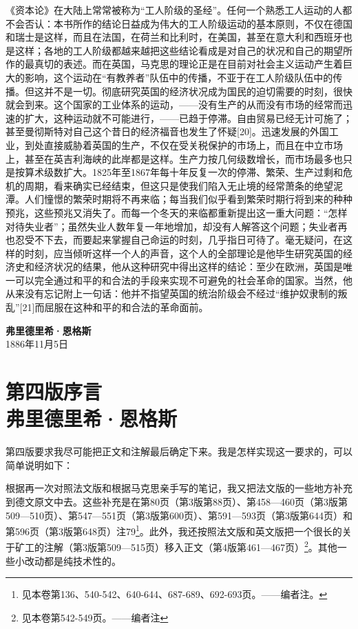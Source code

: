 \documentclass{ctexbook}
\begin{document}
《资本论》在大陆上常常被称为“工人阶级的圣经”。任何一个熟悉工人运动的人都不会否认：本书所作的结论日益成为伟大的工人阶级运动的基本原则，不仅在德国和瑞士是这样，而且在法国，在荷兰和比利时，在美国，甚至在意大利和西班牙也是这样；各地的工人阶级都越来越把这些结论看成是对自己的状况和自己的期望所作的最真切的表述。而在英国，马克思的理论正是在目前对社会主义运动产生着巨大的影响，这个运动在“有教养者”队伍中的传播，不亚于在工人阶级队伍中的传播。但这并不是一切。彻底研究英国的经济状况成为国民的迫切需要的时刻，很快就会到来。这个国家的工业体系的运动，——没有生产的从而没有市场的经常而迅速的扩大，这种运动就不可能进行，——已趋于停滞。自由贸易已经无计可施了；甚至曼彻斯特对自己这个昔日的经济福音也发生了怀疑[20]。迅速发展的外国工业，到处直接威胁着英国的生产，不仅在受关税保护的市场上，而且在中立市场上，甚至在英吉利海峡的此岸都是这样。生产力按几何级数增长，而市场最多也只是按算术级数扩大。1825年至1867年每十年反复一次的停滞、繁荣、生产过剩和危机的周期，看来确实已经结束，但这只是使我们陷入无止境的经常萧条的绝望泥潭。人们憧憬的繁荣时期将不再来临；每当我们似乎看到繁荣时期行将到来的种种预兆，这些预兆又消失了。而每一个冬天的来临都重新提出这一重大问题：“怎样对待失业者”；虽然失业人数年复一年地增加，却没有人解答这个问题；失业者再也忍受不下去，而要起来掌握自己命运的时刻，几乎指日可待了。毫无疑问，在这样的时刻，应当倾听这样一个人的声音，这个人的全部理论是他毕生研究英国的经济史和经济状况的结果，他从这种研究中得出这样的结论：至少在欧洲，英国是唯一可以完全通过和平的和合法的手段来实现不可避免的社会革命的国家。当然，他从来没有忘记附上一句话：他并不指望英国的统治阶级会不经过“维护奴隶制的叛乱”[21]而屈服在这种和平的和合法的革命面前。

\begin{flushright}
    \textbf{弗里德里希·恩格斯}\\
    \small{1886年11月5日}
\end{flushright}


\chapter[弗里德里希·恩格斯\hspace{1em}第四版序言]{第四版序言\\{\small 弗里德里希·恩格斯}}

第四版要求我尽可能把正文和注解最后确定下来。我是怎样实现这一要求的，可以简单说明如下：

根据再一次对照法文版和根据马克思亲手写的笔记，我又把法文版的一些地方补充到德文原文中去。这些补充是在第80页（第3版第88页）、第458—460页（第3版第509—510页）、第547—551页（第3版第600页）、第591—593页（第3版第644页）和第596页（第3版第648页）注79\footnote{见本卷第136、540-542、640-644、687-689、692-693页。——编者注。}。此外，我还按照法文版和英文版把一个很长的关于矿工的注解（第3版第509—515页）移入正文（第4版第461—467页）\footnote{见本卷第542-549页。——编者注}。其他一些小改动都是纯技术性的。
\end{document}
